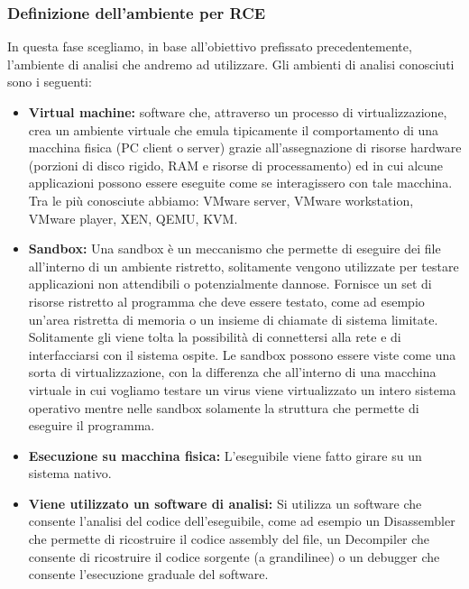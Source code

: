 \documentclass{article}
\begin{document}
\subsubsection{Definizione dell’ambiente per RCE}
In questa fase scegliamo, in base all’obiettivo prefissato precedentemente, l’ambiente di analisi 
che andremo ad utilizzare. Gli ambienti di analisi conosciuti sono i seguenti:
\begin{itemize}
    \item \textbf{Virtual machine:} software che, attraverso un processo di virtualizzazione, 
    crea un ambiente virtuale che emula tipicamente il comportamento di una macchina fisica 
    (PC client o server) grazie all'assegnazione di risorse hardware (porzioni di disco rigido, 
    RAM e risorse di processamento) ed in cui alcune applicazioni possono essere eseguite come 
    se interagissero con tale macchina. Tra le più conosciute abbiamo: VMware server, 
    VMware workstation, VMware player, XEN, QEMU, KVM.
    \item \textbf{Sandbox:} Una sandbox è un meccanismo che permette di eseguire dei file all’interno 
    di un ambiente ristretto, solitamente vengono utilizzate per testare applicazioni non attendibili 
    o potenzialmente dannose.
    Fornisce un set di risorse ristretto al programma che deve essere testato, come ad esempio un’area 
    ristretta di memoria o un insieme di chiamate di sistema limitate.
    Solitamente gli viene tolta la possibilità di connettersi alla rete e di interfacciarsi con il 
    sistema ospite.
    Le sandbox possono essere viste come una sorta di virtualizzazione, con la differenza che 
    all’interno di una macchina virtuale in cui vogliamo testare un virus viene virtualizzato un 
    intero sistema operativo mentre nelle sandbox solamente la struttura che permette di eseguire il programma.
    \item \textbf{Esecuzione su macchina fisica:} L’eseguibile viene fatto girare su un sistema nativo.
    \item \textbf{Viene utilizzato un software di analisi:} Si utilizza un software che consente l’analisi del 
    codice dell’eseguibile, come ad esempio un Disassembler che permette di ricostruire il codice assembly del 
    file, un Decompiler  che consente di ricostruire il codice sorgente (a grandilinee) o un debugger che 
    consente l’esecuzione graduale del software.
\end{itemize}
\end{document}
